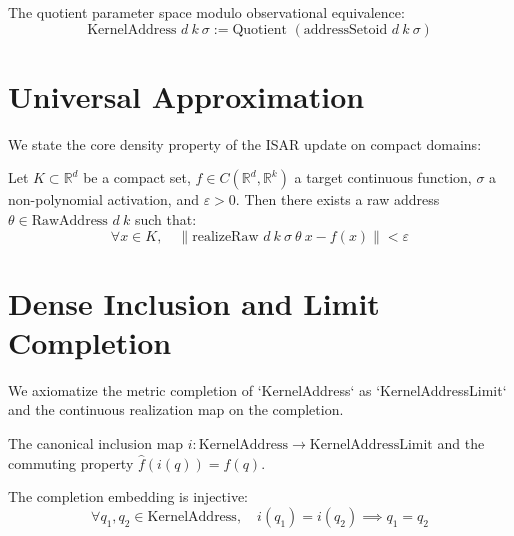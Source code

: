 \begin{definition}[KernelAddress]
The quotient parameter space modulo observational equivalence:
$$\text{KernelAddress } d\ k\ \sigma := \text{Quotient } (\text{addressSetoid } d\ k\ \sigma)$$
\end{definition}

\section{Universal Approximation}

We state the core density property of the ISAR update on compact domains:

\begin{axiom}
Let $K \subset \mathbb{R}^d$ be a compact set, $f \in C(\mathbb{R}^d, \mathbb{R}^k)$ a target continuous function, $\sigma$ a non-polynomial activation, and $\varepsilon > 0$. Then there exists a raw address $\theta \in \text{RawAddress } d\ k$ such that:
$$\forall x \in K, \quad \| \text{realizeRaw } d\ k\ \sigma\ \theta\ x - f(x) \| < \varepsilon$$
\end{axiom}

\section{Dense Inclusion and Limit Completion}

\begin{axiom}
We axiomatize the metric completion of `KernelAddress` as `KernelAddressLimit` and the continuous realization map on the completion.
\end{axiom}

\begin{axiom}
The canonical inclusion map $i : \text{KernelAddress} \to \text{KernelAddressLimit}$ and the commuting property $\hat{f}(i(q)) = f(q)$.
\end{axiom}

\begin{theorem}
The completion embedding is injective:
$$\forall q_1, q_2 \in \text{KernelAddress}, \quad i(q_1) = i(q_2) \implies q_1 = q_2$$
\end{theorem}


